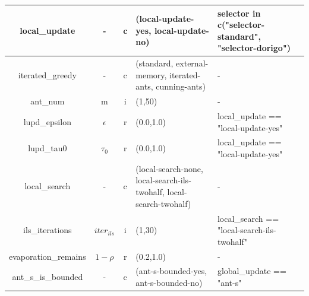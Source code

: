 \documentclass[12pt,a4paper,oneside]{book}
\begin{document}
\begin{table}[]
\begin{tabular}{|c|c|c|p{4cm}|p{4cm}|}
local\_update                   & -          & c    & (local-update-yes, local-update-no)                                             & selector in c("selector-standard", "selector-dorigo")                                          \\ \hline
iterated\_greedy                & -          & c    & (standard, external-memory, iterated-ants, cunning-ants)                          & -                                                                                             \\ \hline
ant\_num                        & m          & i    & (1,50)                                                                         & -                                                                                             \\ \hline
lupd\_epsilon                   & $\epsilon$ & r    & (0.0,1.0)                                                                      & local\_update == "local-update-yes"                                                           \\ \hline
lupd\_tau0                      & $\tau_0$   & r    & (0.0,1.0)                                                                      & local\_update == "local-update-yes"                                                           \\ \hline
local\_search                   & -          & c    & (local-search-none, local-search-ils-twohalf, local-search-twohalf)              & -                                                                                             \\ \hline
ils\_iterations                 & $iter_{ils}$ & i    & (1,30)                                                                         & local\_search == "local-search-ils-twohalf"                                                   \\ \hline
evaporation\_remains            & $1-\rho$   & r    & (0.2,1.0)                                                                      & -                                                                                             \\ \hline
ant\_s\_is\_bounded             & -          & c    & (ant-s-bounded-yes, ant-s-bounded-no)                                           & global\_update == "ant-s"                                                                     \\ \hline
\end{tabular}
\end{table}
\end{document}
